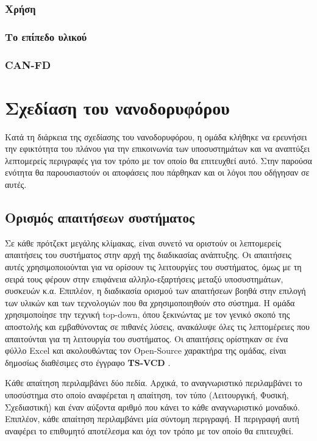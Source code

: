 \documentclass[a4paper,nobib,justified]{tufte-book}
\begin{document}
\subsection{Χρήση}
\subsection{Το επίπεδο υλικού}
\subsection{CAN-FD}

\chapter{Σχεδίαση του νανοδορυφόρου}
\label{design-choices}
Κατά τη διάρκεια της σχεδίασης του νανοδορυφόρου, η ομάδα κλήθηκε να ερευνήσει την εφικτότητα του πλάνου για την επικοινωνία των υποσυστημάτων και να αναπτύξει λεπτομερείς περιγραφές για τον τρόπο με τον οποίο θα επιτευχθεί αυτό. Στην παρούσα ενότητα θα παρουσιαστούν οι αποφάσεις που πάρθηκαν και οι λόγοι που οδήγησαν σε αυτές.

\section{Ορισμός απαιτήσεων συστήματος}
Σε κάθε πρότζεκτ μεγάλης κλίμακας, είναι συνετό να οριστούν οι λεπτομερείς απαιτήσεις του συστήματος στην αρχή της διαδικασίας ανάπτυξης. Οι απαιτήσεις αυτές χρησιμοποιούνται για να ορίσουν τις λειτουργίες του συστήματος, όμως με τη σειρά τους φέρουν στην επιφάνεια αλληλο-εξαρτήσεις μεταξύ υποσυστημάτων, συσκευών κ.α. Επιπλέον, η διαδικασία ορισμού των απαιτήσεων βοηθά στην επιλογή των υλικών και των τεχνολογιών που θα χρησιμοποιηθούν στο σύστημα. Η ομάδα χρησιμοποίησε την τεχνική top-down, όπου ξεκινώντας με τον γενικό σκοπό της αποστολής και εμβαθύνοντας σε πιθανές λύσεις, ανακάλυψε όλες τις λεπτομέρειες που απαιτούνται για τη λειτουργία του συστήματος. Οι απαιτήσεις ορίστηκαν σε ένα φύλλο Excel και ακολουθώντας τον Open-Source χαρακτήρα της ομάδας, είναι δημοσίως διαθέσιμες στο έγγραφο \textbf{TS-VCD} .

Κάθε απαίτηση περιλαμβάνει δύο πεδία. Αρχικά, το αναγνωριστικό περιλαμβάνει το υποσύστημα στο οποίο αναφέρεται η απαίτηση, τον τύπο (Λειτουργική, Φυσική, Σχεδιαστική) και έναν αύξοντα αριθμό που κάνει το κάθε αναγνωριστικό μοναδικό. Επιπλέον, κάθε απαίτηση περιλαμβάνει μία σύντομη περιγραφή. Η περιγραφή αυτή αναφέρει το επιθυμητό αποτέλεσμα και όχι τον τρόπο με τον οποίο θα επιτευχθεί.
\end{document}
